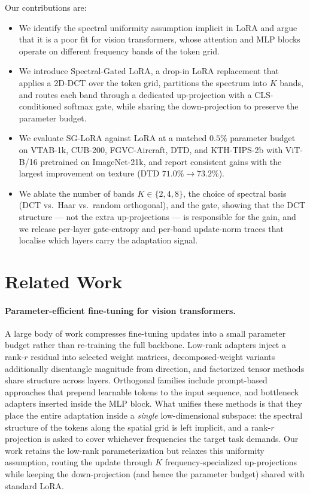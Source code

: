 \documentclass{article}
\begin{document}
Our contributions are:
\begin{itemize}
  \item We identify the spectral uniformity assumption implicit in LoRA and argue that it is a poor fit for vision transformers, whose attention and MLP blocks operate on different frequency bands of the token grid.
  \item We introduce Spectral-Gated LoRA, a drop-in LoRA replacement that applies a 2D-DCT over the token grid, partitions the spectrum into $K$ bands, and routes each band through a dedicated up-projection with a CLS-conditioned softmax gate, while sharing the down-projection to preserve the parameter budget.
  \item We evaluate SG-LoRA against LoRA at a matched $0.5\%$ parameter budget on VTAB-1k, CUB-200, FGVC-Aircraft, DTD, and KTH-TIPS-2b with ViT-B/16 pretrained on ImageNet-21k, and report consistent gains with the largest improvement on texture (DTD $71.0\% \rightarrow 73.2\%$).
  \item We ablate the number of bands $K \in \{2,4,8\}$, the choice of spectral basis (DCT vs.\ Haar vs.\ random orthogonal), and the gate, showing that the DCT structure — not the extra up-projections — is responsible for the gain, and we release per-layer gate-entropy and per-band update-norm traces that localise which layers carry the adaptation signal.
\end{itemize}

\section{Related Work}
\paragraph{Parameter-efficient fine-tuning for vision transformers.}
A large body of work compresses fine-tuning updates into a small parameter budget rather than re-training the full backbone. Low-rank adapters inject a rank-$r$ residual into selected weight matrices, decomposed-weight variants additionally disentangle magnitude from direction, and factorized tensor methods share structure across layers. Orthogonal families include prompt-based approaches that prepend learnable tokens to the input sequence, and bottleneck adapters inserted inside the MLP block. What unifies these methods is that they place the entire adaptation inside a \emph{single} low-dimensional subspace: the spectral structure of the tokens along the spatial grid is left implicit, and a rank-$r$ projection is asked to cover whichever frequencies the target task demands. Our work retains the low-rank parameterization but relaxes this uniformity assumption, routing the update through $K$ frequency-specialized up-projections while keeping the down-projection (and hence the parameter budget) shared with standard LoRA.
\end{document}
